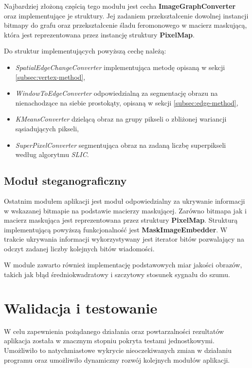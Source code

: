 {{{            Najbardziej złożoną częścią tego modułu jest cecha \textbf{ImageGraphConverter} oraz implementujące je
            struktury. Jej zadaniem przekształcenie dowolnej instancji bitmapy do grafu oraz przekształcenie śladu
            feromonowego w macierz maskującą, która jest reprezentowana przez instancję struktury \textbf{PixelMap}.

            Do struktur implementujących powyższą cechę należą:

            \begin{itemize}
                \item \textit{SpatialEdgeChangeConverter} implementująca metodę opisaną w sekcji
                \ref{subsec:vertex-method},
                \item \textit{WindowToEdgeConverter} odpowiedzialną za segmentację obrazu na nienachodzące na siebie
                prostokąty, opisaną w sekcji \ref{subsec:edge-method},
                \item \textit{KMeansConverter} dzielącą obraz na grupy pikseli o zbliżonej wariancji sąsiadujących pikseli,
                \item \textit{SuperPixelConverter} segmentująca obraz na zadaną liczbę superpikseli według algorytmu
                \textit{SLIC}.
            \end{itemize}
        }

        \subsection{Moduł steganograficzny}
        {
            Ostatnim modułem aplikacji jest moduł odpowiedzialny za ukrywanie informacji w wskazanej bitmapie na
            podstawie macierzy maskującej. Zarówno bitmapa jak i macierz maskująca jest reprezentowana przez struktury
            \textbf{PixelMap}. Strukturą implementującą powyższą funkcjonalność jest \textbf{MaskImageEmbedder}. W
            trakcie ukrywania informacji wykorzystywany jest iterator bitów pozwalający na odczyt zadanej liczby
            kolejnych bitów wiadomości.

            W module zawarto również implementację podstawowych miar jakości obrazów, takich jak błąd średniokwadratowy
            i szczytowy stosunek sygnału do szumu.
        }
    }



    \section{Walidacja i testowanie}
    {
        W celu zapewnienia pożądanego działania oraz powtarzalności rezultatów aplikacja została w znacznym stopniu
        pokryta testami jednostkowymi. Umożliwiło to natychmiastowe wykrycie nieoczekiwanych zmian w działaniu programu
        oraz umożliwiło dynamiczny rozwój kolejnych modułów aplikacji.

}}

